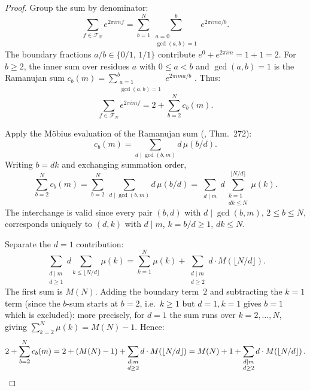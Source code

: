 \documentclass[11pt]{article}
\theoremstyle{definition}
\newcommand{\F}{\mathcal{F}}
\begin{document}
\begin{proof}
Group the sum by denominator:
\begin{equation*}
\sum_{f \in \F_N} e^{2\pi i m f}
= \sum_{b=1}^{N} \sum_{\substack{a=0 \\ \gcd(a,b)=1}}^{b}
e^{2\pi i m a/b}.
\end{equation*}
The boundary fractions $a/b \in \{0/1,\, 1/1\}$ contribute
$e^0 + e^{2\pi im} = 1 + 1 = 2$.
For $b \ge 2$, the inner sum over residues $a$ with
$0 \le a < b$ and $\gcd(a,b)=1$ is the Ramanujan sum
$c_b(m) = \sum_{\substack{a=1\\ \gcd(a,b)=1}}^{b} e^{2\pi i m a/b}$
\cite{Ramanujan1918}.  Thus:
\begin{equation*}
\sum_{f \in \F_N} e^{2\pi i m f} = 2 + \sum_{b=2}^{N} c_b(m).
\end{equation*}

Apply the Möbius evaluation of the Ramanujan sum
(\cite{HardyWright2008}, Thm.~272):
\begin{equation*}
c_b(m) = \sum_{d \mid \gcd(b,m)} d\,\mu(b/d).
\end{equation*}
Writing $b = dk$ and exchanging summation order,
\begin{equation*}
\sum_{b=2}^{N} c_b(m)
= \sum_{b=2}^{N}\ \sum_{d \mid \gcd(b,m)} d\,\mu(b/d)
= \sum_{\substack{d \mid m}} d \sum_{\substack{k=1 \\ dk \le N}}^{\lfloor N/d \rfloor} \mu(k).
\end{equation*}
The interchange is valid since every pair $(b,d)$ with $d \mid \gcd(b,m)$,
$2 \le b \le N$, corresponds uniquely to $(d,k)$ with $d \mid m$, $k = b/d \ge 1$,
$dk \le N$.

Separate the $d=1$ contribution:
\begin{equation*}
\sum_{\substack{d \mid m \\ d \ge 1}} d \sum_{k \le \lfloor N/d \rfloor} \mu(k)
= \sum_{k=1}^{N} \mu(k) + \sum_{\substack{d \mid m \\ d \ge 2}} d \cdot M\!\left(\lfloor N/d \rfloor\right).
\end{equation*}
The first sum is $M(N)$.  Adding the boundary term~$2$ and
subtracting the $k=1$ term (since the $b$-sum starts at $b=2$,
i.e.\ $k \ge 1$ but $d=1, k=1$ gives $b=1$ which is excluded):
more precisely, for $d=1$ the sum runs over $k=2,\ldots,N$, giving
$\sum_{k=2}^{N}\mu(k) = M(N)-1$.  Hence:
\begin{equation*}
2 + \sum_{b=2}^{N} c_b(m)
= 2 + (M(N) - 1) + \sum_{\substack{d \mid m \\ d \ge 2}} d\cdot M\!\left(\lfloor N/d \rfloor\right)
= M(N) + 1 + \sum_{\substack{d \mid m \\ d \ge 2}} d\cdot M\!\left(\lfloor N/d \rfloor\right). \qedhere
\end{equation*}
\end{proof}
\end{document}
